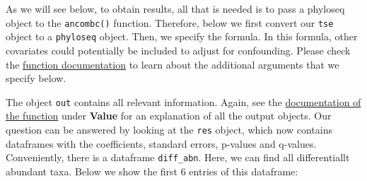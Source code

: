 \documentclass[
]{book}
\newenvironment{Shaded}{\begin{snugshade}}{\end{snugshade}}
\newcommand{\AttributeTok}[1]{\textcolor[rgb]{0.77,0.63,0.00}{#1}}
\newcommand{\CommentTok}[1]{\textcolor[rgb]{0.56,0.35,0.01}{\textit{#1}}}
\newcommand{\ConstantTok}[1]{\textcolor[rgb]{0.00,0.00,0.00}{#1}}
\newcommand{\DecValTok}[1]{\textcolor[rgb]{0.00,0.00,0.81}{#1}}
\newcommand{\FloatTok}[1]{\textcolor[rgb]{0.00,0.00,0.81}{#1}}
\newcommand{\FunctionTok}[1]{\textcolor[rgb]{0.00,0.00,0.00}{#1}}
\newcommand{\NormalTok}[1]{#1}
\newcommand{\OtherTok}[1]{\textcolor[rgb]{0.56,0.35,0.01}{#1}}
\newcommand{\SpecialCharTok}[1]{\textcolor[rgb]{0.00,0.00,0.00}{#1}}
\newcommand{\StringTok}[1]{\textcolor[rgb]{0.31,0.60,0.02}{#1}}
\begin{document}
As we will see below, to obtain results, all that is needed is to pass
a phyloseq object to the \texttt{ancombc()} function. Therefore, below we first convert
our \texttt{tse} object to a \texttt{phyloseq} object. Then, we specify the formula. In this formula,
other covariates could potentially be included to adjust for confounding.
Please check the \href{https://rdrr.io/github/FrederickHuangLin/ANCOMBC/man/ancombc.html}{function documentation}
to learn about the additional arguments that we specify below.

\begin{Shaded}
\end{Shaded}

The object \texttt{out} contains all relevant information. Again, see the
\href{https://rdrr.io/github/FrederickHuangLin/ANCOMBC/man/ancombc.html}{documentation of the function}
under \textbf{Value} for an explanation of all the output objects. Our question can be answered
by looking at the \texttt{res} object, which now contains dataframes with the coefficients,
standard errors, p-values and q-values. Conveniently, there is a dataframe \texttt{diff\_abn}.
Here, we can find all differentiallt abundant taxa. Below we show the first 6 entries of this dataframe:
\end{document}
